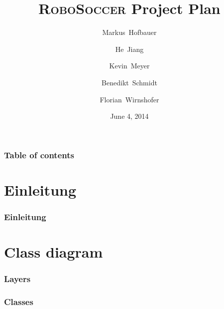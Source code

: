 \documentclass[hyperref={pdfpagelabels=false}]{beamer}
\title{\textsc{RoboSoccer} Project Plan}
\author[Hofbauer, Jiang, Meyer, Schmidt, Wirnshofer]{
  Markus~Hofbauer \and
  He~Jiang \and
  Kevin~Meyer \and
  Benedikt~Schmidt \and
  Florian~Wirnshofer
}
\institute
{
	Technische Universit\"at M\"unchen, Germany
}
\date{June 4, 2014}
\begin{document}
\begin{frame}
\titlepage
\end{frame} 

\begin{frame}
	\frametitle{Table of contents}
	\tableofcontents
\end{frame} 

\section{Einleitung} 
\begin{frame}
	\frametitle{Einleitung} 
\end{frame}

\section{Class diagram}
\begin{frame}
	\frametitle{Layers}
	\begin{center}
		
	\end{center}
\end{frame}

\begin{frame}
	\frametitle{Classes}
	\begin{center}
		
	\end{center}
\end{frame}
\end{document}
